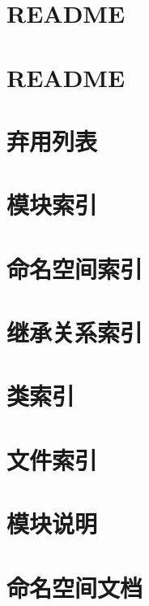 \documentclass[twoside]{book}
\newcommand{\+}{\discretionary{\mbox{\scriptsize$\hookleftarrow$}}{}{}}
\begin{document}
\begin{CJK}{UTF8}{gbsn}
\chapter{README}
\label{md__d__zhr_files__multitarget_tracker_master_thirdparty_pybind11__r_e_a_d_m_e}

\chapter{README}
\label{md__d__zhr_files__multitarget_tracker_master_thirdparty_pybind11_tools_clang__r_e_a_d_m_e}

\chapter{弃用列表}
\label{deprecated}

\chapter{模块索引}

\chapter{命名空间索引}

\chapter{继承关系索引}

\chapter{类索引}

\chapter{文件索引}

\chapter{模块说明}



\chapter{命名空间文档}























\end{CJK}
\end{document}
